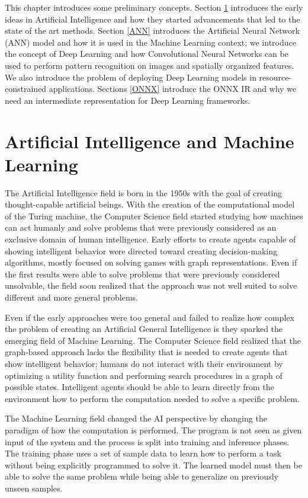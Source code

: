 \documentclass[../main.tex]{subfiles}
\begin{document}
This chapter introduces some preliminary concepts. 
Section \ref{AI-ML} introduces the early ideas in Artificial Intelligence and how they started advancements that led to the state of the art methods.
Section \ref{ANN} introduces the Artificial Neural Network (ANN) model and how it is used in the Machine Learning context; we introduce the concept of Deep Learning and how Convolutional Neural Networks can be used to perform pattern recognition on images and spatially organized features. 
We also introduce the problem of deploying Deep Learning models in resource-constrained applications.
Sections \ref{ONNX} introduce the ONNX IR and why we need an intermediate representation for Deep Learning frameworks.

\newpage

\section{Artificial Intelligence and Machine Learning}
\label{AI-ML}

The Artificial Intelligence field is born in the 1950s with the goal of creating thought-capable artificial beings. 
With the creation of the computational model of the Turing machine, the Computer Science field started studying how machines can act humanly and solve problems that were previously considered as an exclusive domain of human intelligence.
Early efforts to create agents capable of showing intelligent behavior were directed toward creating decision-making algorithms, mostly focused on solving games with graph representations.
Even if the first results were able to solve problems that were previously considered unsolvable, the field soon realized that the approach was not well suited to solve different and more general problems.

Even if the early approaches were too general and failed to realize how complex the problem of creating an Artificial General Intelligence is they sparked the emerging field of Machine Learning. 
The Computer Science field realized that the graph-based approach lacks the flexibility that is needed to create agents that show intelligent behavior; humans do not interact with their environment by optimizing a utility function and performing search procedures in a graph of possible states. 
Intelligent agents should be able to learn directly from the environment how to perform the computation needed to solve a specific problem.


The Machine Learning field changed the AI perspective by changing the paradigm of how the computation is performed. 
The program is not seen as given input of the system and the process is split into training and inference phases. 
The training phase uses a set of sample data to learn how to perform a task without being explicitly programmed to solve it. 
The learned model must then be able to solve the same problem while being able to generalize on previously unseen samples.
\end{document}
